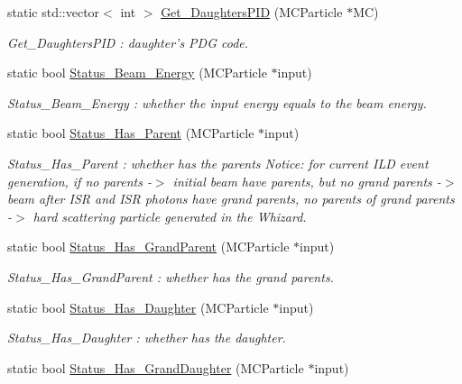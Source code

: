 \begin{DoxyCompactItemize}
static std::vector$<$ int $>$ \hyperlink{classToolSet_1_1CMC_ae0aeb5054574c5c8ffd3f24e86d662a6}{Get\_\-DaughtersPID} (MCParticle $\ast$MC)
\begin{DoxyCompactList}\small\item\em Get\_\-DaughtersPID : daughter's PDG code. \item\end{DoxyCompactList}\item 
static bool \hyperlink{classToolSet_1_1CMC_a3ebc24c0c160ba37054b294059f09d96}{Status\_\-Beam\_\-Energy} (MCParticle $\ast$input)
\begin{DoxyCompactList}\small\item\em Status\_\-Beam\_\-Energy : whether the input energy equals to the beam energy. \item\end{DoxyCompactList}\item 
static bool \hyperlink{classToolSet_1_1CMC_acd1cf4b7527b2e2bd194ad688b29b132}{Status\_\-Has\_\-Parent} (MCParticle $\ast$input)
\begin{DoxyCompactList}\small\item\em Status\_\-Has\_\-Parent : whether has the parents Notice: for current ILD event generation, if no parents -\/$>$ initial beam have parents, but no grand parents -\/$>$ beam after ISR and ISR photons have grand parents, no parents of grand parents -\/$>$ hard scattering particle generated in the Whizard. \item\end{DoxyCompactList}\item 
static bool \hyperlink{classToolSet_1_1CMC_a88ff52dd7c66369b43eb8619a1383e7d}{Status\_\-Has\_\-GrandParent} (MCParticle $\ast$input)
\begin{DoxyCompactList}\small\item\em Status\_\-Has\_\-GrandParent : whether has the grand parents. \item\end{DoxyCompactList}\item 
static bool \hyperlink{classToolSet_1_1CMC_a1771a4a8936446f9dfe5f9d22b5d9322}{Status\_\-Has\_\-Daughter} (MCParticle $\ast$input)
\begin{DoxyCompactList}\small\item\em Status\_\-Has\_\-Daughter : whether has the daughter. \item\end{DoxyCompactList}\item 
static bool \hyperlink{classToolSet_1_1CMC_a79d54fb4529c17a59ab21a51b3f6889c}{Status\_\-Has\_\-GrandDaughter} (MCParticle $\ast$input)

\end{DoxyCompactItemize}

